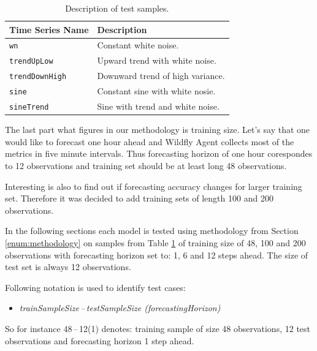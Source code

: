     \begin{table}[h]
        \begin{center}
            \begin{tabular}{l|l}
                \textbf{Time Series Name} &  \textbf{Description} \\ \hline \hline
                \texttt{wn} & Constant white noise. \\
                \texttt{trendUpLow} & Upward trend with white noise. \\
                \texttt{trendDownHigh} & Downward trend of high variance. \\
                \texttt{sine} & Constant sine with white nosie. \\
                \texttt{sineTrend} & Sine with trend and white noise. \\
            \end{tabular}
            \caption{Description of test samples.}
            \label{tab:test-samples-description}
        \end{center}
    \end{table}

    The last part what figures in our methodology is training size. Let's say that one would like to forecast one hour
    ahead and Wildfly Agent collects most of the metrics in five minute intervals. Thus forecasting horizon of one
    hour corespondes to 12 observations and training set should be at least long 48 observations.

    Interesting is also to find out if forecasting accuracy changes for larger training set. Therefore it
    was decided to add training sets of length 100 and 200 observations.

    In the following sections each model is tested using methodology from Section \ref{enum:methodology} on
    samples from Table \ref{tab:test-samples-description} of training size of 48, 100 and 200 observations with
    forecasting horizon set to: 1, 6 and 12 steps ahead. The size of test set is always 12 observations.

    Following notation is used to identify test cases:
    \begin{itemize}
        \item \emph{trainSampleSize\,--\,testSampleSize (forecastingHorizon)}
    \end{itemize}
    So for instance 48\,--\,12(1) denotes: training sample of size 48 observations, 12 test observations and
    forecasting horizon 1 step ahead.

